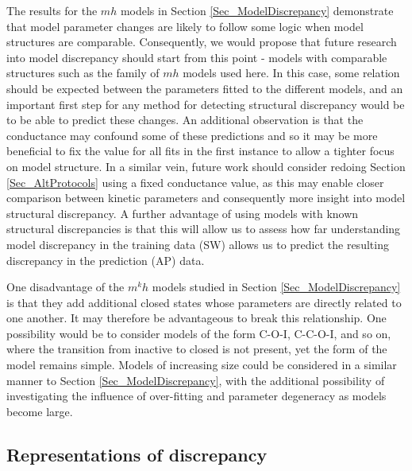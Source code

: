 \documentclass[11pt,a4paper,oneside]{article}
\begin{document}
The results for the $mh$ models in Section \ref{Sec_ModelDiscrepancy} demonstrate that model parameter changes are likely to follow some logic when model structures are comparable. Consequently, we would propose that future research into model discrepancy should start from this point - models with comparable structures such as the family of $mh$ models used here. In this case, some relation should be expected between the parameters fitted to the different models, and an important first step for any method for detecting structural discrepancy would be to be able to predict these changes. An additional observation is that the conductance may confound some of these predictions and so it may be more beneficial to fix the value for all fits in the first instance to allow a tighter focus on model structure. In a similar vein, future work should consider redoing Section \ref{Sec_AltProtocols} using a fixed conductance value, as this may enable closer comparison between kinetic parameters and consequently more insight into model structural discrepancy. A further advantage of using models with known structural discrepancies is that this will allow us to assess how far understanding model discrepancy in the training data (SW) allows us to predict the resulting discrepancy in the prediction (AP) data.

One disadvantage of the $m^kh$ models studied in Section \ref{Sec_ModelDiscrepancy} is that they add additional closed states whose parameters are directly related to one another. It may therefore be advantageous to break this relationship. One possibility would be to consider models of the form C-O-I, C-C-O-I, and so on, where the transition from inactive to closed is not present, yet the form of the model remains simple. Models of increasing size could be considered in a similar manner to Section \ref{Sec_ModelDiscrepancy}, with the additional possibility of investigating the influence of over-fitting and parameter degeneracy as models become large. 

\subsection{Representations of discrepancy}
\end{document}
